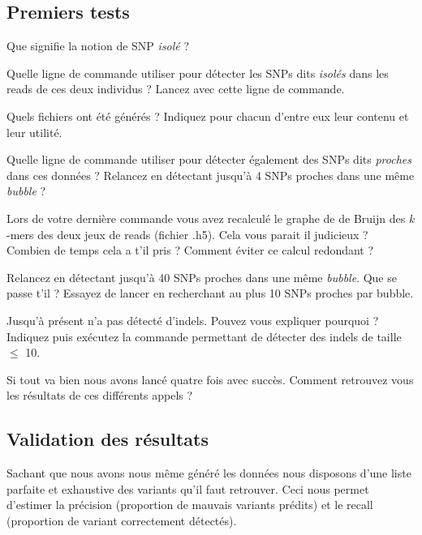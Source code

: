 \subsection{Premiers tests}
\qu Que signifie la notion de SNP \emph{isolé} ?

\qu Quelle ligne de commande utiliser pour détecter les SNPs dits \emph{isolés} dans les reads de ces deux individus ? Lancez \discopp avec cette ligne de commande. 

\qu Quels fichiers ont été générés ? Indiquez pour chacun d'entre eux leur contenu et leur utilité. 

\qu Quelle ligne de commande utiliser pour détecter également des SNPs dits \emph{proches} dans ces données ? Relancez \discopp en détectant jusqu'à 4 SNPs proches dans une même \emph{bubble} ?

\qu Lors de votre dernière commande vous avez recalculé le graphe de de Bruijn des $k$-mers des deux jeux de reads (fichier .h5). Cela vous parait il judicieux ? Combien de temps cela a t'il pris ? Comment éviter ce calcul redondant ? 

\qu Relancez \discopp en détectant jusqu'à 40 SNPs proches dans une même \emph{bubble}. Que se passe t'il ? Essayez de lancer \discopp en recherchant au plus 10 SNPs proches par bubble. 

\qu Jusqu'à présent \discopp n'a pas détecté d'indels. Pouvez vous expliquer pourquoi ? Indiquez puis exécutez la commande permettant de détecter des indels de taille $\leq$ 10.

\qu Si tout va bien nous avons lancé quatre fois \discopp avec succès. Comment retrouvez vous les résultats de ces différents appels ? 

\subsection{Validation des résultats}
Sachant que nous avons nous même généré les données nous disposons d'une liste parfaite et exhaustive des variants qu'il faut retrouver. Ceci nous permet d'estimer la précision (proportion de mauvais variants prédits) et le recall (proportion de variant correctement détectés).




